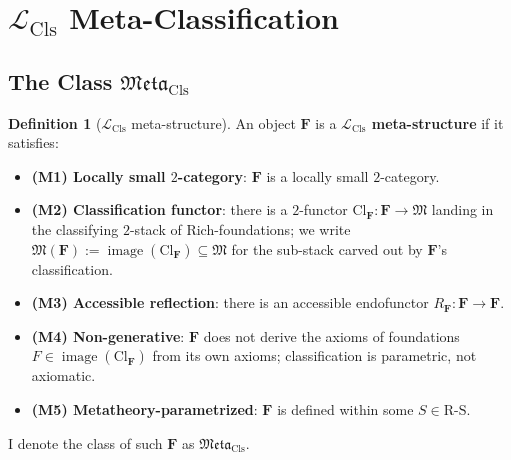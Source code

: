 \documentclass[11pt]{article}
\theoremstyle{plain}
\theoremstyle{definition}
\newtheorem{definition}[theorem]{Definition}
\newcommand{\RS}{\mathrm{R\text{-}S}}
\newcommand{\fM}{\mathfrak{M}}
\newcommand{\Meta}{\mathfrak{Meta}}
\newcommand{\LCls}{\mathcal{L}_{\mathrm{Cls}}}
\newcommand{\Cl}{\mathrm{Cl}}
\DeclareMathOperator{\image}{image}
\begin{document}
\section{\texorpdfstring{$\LCls$ Meta-Classification}{Classifier Meta-Classification}}\label{sec:meta}

\subsection{\texorpdfstring{The Class $\Meta_{\mathrm{Cls}}$}{The Class Meta\_5+}}

\begin{definition}[$\LCls$ meta-structure]\label{def:meta}
An object $\mathbf{F}$ is a \textbf{$\LCls$ meta-structure} if it satisfies:
\begin{itemize}
\item \textbf{(M1) Locally small $2$-category}: $\mathbf{F}$ is a locally small $2$-category.
\item \textbf{(M2) Classification functor}: there is a $2$-functor $\Cl_{\mathbf{F}} : \mathbf{F} \to \fM$ landing in the classifying $2$-stack of Rich-foundations; we write $\fM(\mathbf{F}) := \image(\Cl_{\mathbf{F}}) \subseteq \fM$ for the sub-stack carved out by $\mathbf{F}$'s classification.
\item \textbf{(M3) Accessible reflection}: there is an accessible endofunctor $R_{\mathbf{F}} : \mathbf{F} \to \mathbf{F}$.
\item \textbf{(M4) Non-generative}: $\mathbf{F}$ does not derive the axioms of foundations $F \in \image(\Cl_{\mathbf{F}})$ from its own axioms; classification is parametric, not axiomatic.
\item \textbf{(M5) Metatheory-parametrized}: $\mathbf{F}$ is defined within some $S \in \RS$.
\end{itemize}
I denote the class of such $\mathbf{F}$ as $\Meta_{\mathrm{Cls}}$.
\end{definition}
\end{document}
